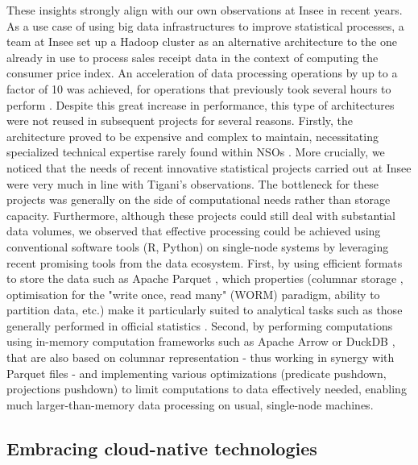 These insights strongly align with our own observations at Insee in recent years. As a use case of using big data infrastructures to improve statistical processes, a team at Insee set up a Hadoop cluster as an alternative architecture to the one already in use to process sales receipt data in the context of computing the consumer price index. An acceleration of data processing operations by up to a factor of 10 was achieved, for operations that previously took several hours to perform \cite{leclair2019utiliser}. Despite this great increase in performance, this type of architectures were not reused in subsequent projects for several reasons. Firstly, the architecture proved to be expensive and complex to maintain, necessitating specialized technical expertise rarely found within NSOs \cite{vale2015international}. More crucially, we noticed that the needs of recent innovative statistical projects carried out at Insee were very much in line with Tigani's observations. The bottleneck for these projects was generally on the side of computational needs rather than storage capacity. Furthermore, although these projects could still deal with substantial data volumes, we observed that effective processing could be achieved using conventional software tools (R, Python) on single-node systems by leveraging recent promising tools from the data ecosystem. First, by using efficient formats to store the data such as Apache Parquet \cite{parquet2013}, which properties (columnar storage \cite{abadi2013design}, optimisation for the "write once, read many" (WORM) paradigm, ability to partition data, etc.) make it particularly suited to analytical tasks such as those generally performed in official statistics \cite{abdelaziz2023optimizing}. Second, by performing computations using in-memory computation frameworks such as Apache Arrow \cite{arrow2016} or DuckDB \cite{raasveldt2019duckdb}, that are also based on columnar representation - thus working in synergy with Parquet files - and implementing various optimizations (predicate pushdown, projections pushdown) to limit computations to data effectively needed, enabling much larger-than-memory data processing on usual, single-node machines.


\subsection{Embracing cloud-native technologies}

